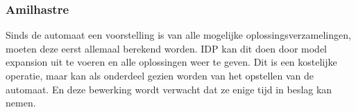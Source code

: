 \subsubsection{Amilhastre}
Sinds de automaat een voorstelling is van alle mogelijke oplossingsverzamelingen, moeten deze eerst allemaal berekend worden. IDP kan dit doen door model expansion uit te voeren en alle oplossingen weer te geven. Dit is een kostelijke operatie, maar kan als onderdeel gezien worden van het opstellen van de automaat. En deze bewerking wordt verwacht dat ze enige tijd in beslag kan nemen. 
